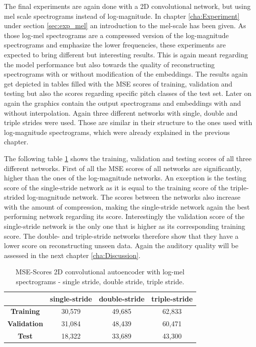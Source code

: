 The final experiments are again done with a 2D convolutional network, but using mel scale spectrograms instead of log-magnitude. In chapter \ref{cha:Experiment} under section \ref{sec:exp_mel} an introduction to the mel-scale has been given. As those log-mel spectrograms are a compressed version of the log-magnitude spectrograms and emphasize the lower frequencies, these experiments are expected to bring different but interesting results. This is again meant regarding the model performance but also towards the quality of reconstructing spectrograms with or without modification of the embeddings. The results again get depicted in tables filled with the MSE scores of training, validation and testing but also the scores regarding specific pitch classes of the test set. Later on again the graphics contain the output spectrograms and embeddings with and without interpolation. Again three different networks with single, double and triple strides were used. Those are similar in their structure to the ones used with log-magnitude spectrograms, which were already explained in the previous chapter.

The following table \ref{tab:res_scores_2D_mel} shows the training, validation and testing scores of all three different networks. First of all the MSE scores of all networks are significantly, higher than the ones of the log-magnitude networks. An exception is the testing score of the single-stride network as it is equal to the training score of the triple-strided log-magnitude network. The scores between the networks also increase with the amount of compression, making the single-stride network again the best performing network regarding its score. Interestingly the validation score of the single-stride network is the only one that is higher as its corresponding training score. The double- and triple-stride networks therefore show that they have a lower score on reconstructing unseen data. Again the auditory quality will be assessed in the next chapter \ref{cha:Discussion}.

\begin{table}[htb!]
    \centering
    \captionsetup{justification=centering}
    \begin{tabular}{|c|c|c|c|}
        \hline
         & \textbf{single-stride} & \textbf{double-stride} & \textbf{triple-stride} \\
         \hline
        \textbf{Training} & 30,579 & 49,685 & 62,833 \\
        \hline
        \textbf{Validation} & 31,084 & 48,439 & 60,471\\
        \hline
        \textbf{Test} & 18,322 & 33,689 & 43,300\\
        \hline
    \end{tabular}
    \caption{MSE-Scores 2D convolutional autoencoder with log-mel spectrograms - single stride, double stride, triple stride.}
    \label{tab:res_scores_2D_mel}
\end{table}

